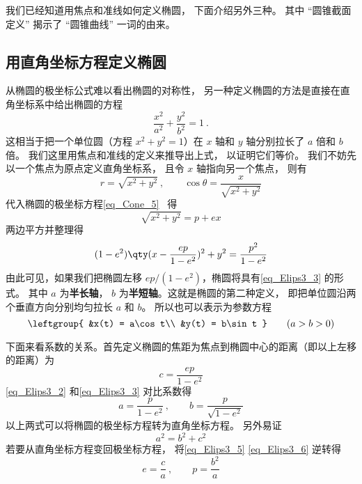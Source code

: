

我们已经知道用焦点和准线如何定义椭圆， 下面介绍另外三种。 其中 “圆锥截面定义” 揭示了 “圆锥曲线” 一词的由来。

\subsection{用直角坐标方程定义椭圆}
从椭圆的极坐标公式难以看出椭圆的对称性， 另一种定义椭圆的方法是直接在直角坐标系中给出椭圆的方程
\begin{equation}\label{eq_Elips3_3}
\frac{x^2}{a^2} + \frac{y^2}{b^2} = 1~.
\end{equation}
这相当于把一个单位圆（方程 $x^2 + y^2 = 1$）在 $x$ 轴和 $y$ 轴分别拉长了 $a$ 倍和 $b$ 倍。 我们这里用焦点和准线的定义来推导出上式， 以证明它们等价。 我们不妨先以一个焦点为原点定义直角坐标系， 且令 $x$ 轴指向另一个焦点， 则有
\begin{equation}
r = \sqrt{x^2 + y^2}~, \qquad \cos\theta = \frac{x}{\sqrt{x^2 + y^2}}
\end{equation}
代入椭圆的极坐标方程\autoref{eq_Cone_5}~ 得
\begin{equation}
\sqrt{x^2 + y^2} = p + ex
\end{equation}
两边平方并整理得
\begin{equation}\label{eq_Elips3_2}
(1 - e^2) \qty( x - \frac{ep}{1 - e^2} )^2 + y^2 = \frac{p^2}{1 - e^2}
\end{equation}
由此可见，如果我们把椭圆左移 $ep/(1 - e^2)$，椭圆将具有\autoref{eq_Elips3_3} 的形式。 其中 $a$ 为\textbf{半长轴}， $b$ 为\textbf{半短轴}。这就是椭圆的第二种定义， 即把单位圆沿两个垂直方向分别均匀拉长 $a$ 和 $b$。 所以也可以表示为参数方程
\begin{equation}\label{eq_Elips3_1}
\leftgroup{
&x(t) = a\cos t\\
&y(t) = b\sin t
} \qquad
(a > b > 0)
\end{equation}

下面来看系数的关系。首先定义椭圆的焦距为焦点到椭圆中心的距离（即以上左移的距离）为
\begin{equation}\label{eq_Elips3_5}
c = \frac{ep}{1 - e^2}
\end{equation}
\autoref{eq_Elips3_2} 和\autoref{eq_Elips3_3} 对比系数得
\begin{equation}\label{eq_Elips3_6}
a = \frac{p}{1 - e^2}~, \qquad b = \frac{p}{\sqrt {1 - e^2} }
\end{equation}
以上两式可以将椭圆的极坐标方程转为直角坐标方程。 另外易证
\begin{equation}\label{eq_Elips3_7}
a^2 = b^2 + c^2
\end{equation}
若要从直角坐标方程变回极坐标方程， 将\autoref{eq_Elips3_5} \autoref{eq_Elips3_6} 逆转得
\begin{equation}\label{eq_Elips3_8}
e = \frac{c}{a}~,\qquad
p = \frac{b^2}{a}
\end{equation}

